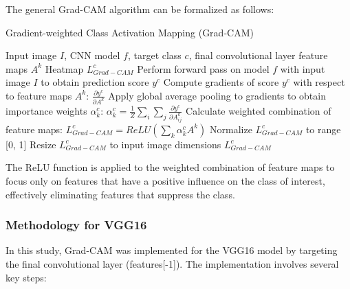 \documentclass[a4paper,12pt]{article}
\begin{document}
The general Grad-CAM algorithm can be formalized as follows:

\begin{algorithm}
\caption{Gradient-weighted Class Activation Mapping (Grad-CAM)}
\begin{algorithmic}[1]
\Input Input image $I$, CNN model $f$, target class $c$, final convolutional layer feature maps $A^k$
\Output Heatmap $L_{Grad-CAM}^c$
\State Perform forward pass on model $f$ with input image $I$ to obtain prediction score $y^c$
\State Compute gradients of score $y^c$ with respect to feature maps $A^k$: $\frac{\partial y^c}{\partial A^k}$
\State Apply global average pooling to gradients to obtain importance weights $\alpha_k^c$: 
       $\alpha_k^c = \frac{1}{Z}\sum_i \sum_j \frac{\partial y^c}{\partial A_{ij}^k}$
\State Calculate weighted combination of feature maps: 
       $L_{Grad-CAM}^c = ReLU\left(\sum_k \alpha_k^c A^k\right)$
\State Normalize $L_{Grad-CAM}^c$ to range [0, 1]
\State Resize $L_{Grad-CAM}^c$ to input image dimensions
\Return $L_{Grad-CAM}^c$
\end{algorithmic}
\end{algorithm}

The ReLU function is applied to the weighted combination of feature maps to focus only on features that have a positive influence on the class of interest, effectively eliminating features that suppress the class.

\subsubsection{Methodology for VGG16}

In this study, Grad-CAM was implemented for the VGG16 model by targeting the final convolutional layer (features[-1]). The implementation involves several key steps:
\end{document}
